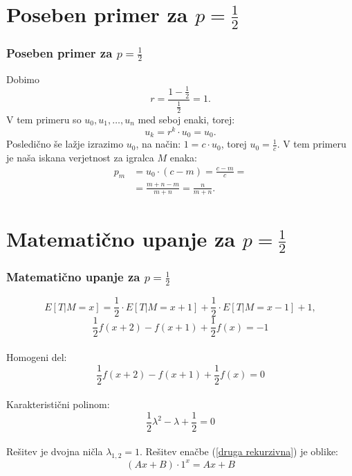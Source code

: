\documentclass[10pt]{beamer}
\begin{document}
\section[Poseben primer za $p = \frac{1}{2}$]{Poseben primer za $p = \frac{1}{2}$}
\begin{frame}
\frametitle{Poseben primer za $p = \frac{1}{2}$}
Dobimo $$r = \frac{1 - \frac{1}{2}}{\frac{1}{2}} = 1.$$
V tem primeru so $u_0, u_1, \dotso, u_n$ med seboj enaki, torej:
$$u_k = r^k \cdot u_0 = u_0.$$
Posledično še lažje izrazimo $u_0$, na način:
$1 = c\cdot u_0$, torej $u_0 = \frac{1}{c}.$
V tem primeru je naša iskana verjetnost za igralca $M$ enaka:
\begin{equation*}
\begin{split}
p_m &= u_0 \cdot (c - m) = \frac{c-m}{c} = \\
		&= \frac{m + n - m}{m + n} = \frac{n}{m + n}.
\end{split} 
\end{equation*}
\end{frame}

\section[Matematično upanje za $p = \frac{1}{2}$]{Matematično upanje za $p = \frac{1}{2}$}
\begin{frame}
\frametitle{Matematično upanje za $p = \frac{1}{2}$}
$$E[T|M=x] = \frac{1}{2}\cdot E[T|M=x+1] + \frac{1}{2}\cdot E[T|M=x-1] + 1,$$
\begin{equation}
\label{druga rekurzivna}
\frac{1}{2}f(x+2)-f(x+1)+\frac{1}{2}f(x)=-1
\end{equation}\\
Homogeni del:\\
$$\frac{1}{2}f(x+2)-f(x+1)+\frac{1}{2}f(x)=0$$\\
Karakteristični polinom:
\begin{equation}
\label{druga homogena}
\frac{1}{2}\lambda^2-\lambda+\frac{1}{2}=0
\end{equation} \\
Rešitev je dvojna ničla $\lambda_{1, 2}= 1$. Rešitev enačbe (\ref{druga rekurzivna}) je oblike:\\ $$(Ax+B)\cdot 1^x=Ax+B$$
\end{frame}
\end{document}
